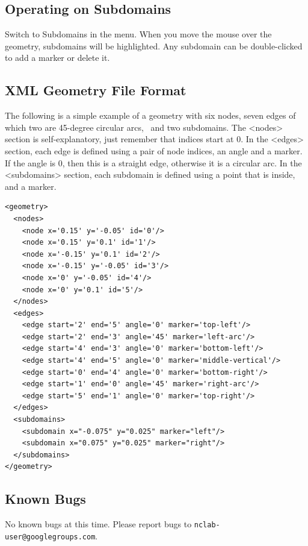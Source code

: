 \documentclass{article}
\begin{document}
\subsection*{Operating on Subdomains}

Switch to Subdomains in the menu. When you move the mouse over the geometry, subdomains will be highlighted. Any subdomain can be double-clicked to add a marker or delete it.

\subsection*{XML Geometry File Format}

The following is a simple example of a geometry with six nodes, seven edges of which two are 45-degree circular arcs,  and two subdomains. The <nodes> section is self-explanatory, just remember that indices start at 0. In the <edges> section, each edge is defined using a pair of node indices, an angle and a marker. If the angle is 0, then this is a straight edge, otherwise it is a circular arc. In the <subdomains> section, each subdomain is defined using a point that is inside, and a marker. 

\begin{verbatim}
<geometry>
  <nodes>
    <node x='0.15' y='-0.05' id='0'/>
    <node x='0.15' y='0.1' id='1'/>
    <node x='-0.15' y='0.1' id='2'/>
    <node x='-0.15' y='-0.05' id='3'/>
    <node x='0' y='-0.05' id='4'/>
    <node x='0' y='0.1' id='5'/>
  </nodes>
  <edges>
    <edge start='2' end='5' angle='0' marker='top-left'/>
    <edge start='2' end='3' angle='45' marker='left-arc'/>
    <edge start='4' end='3' angle='0' marker='bottom-left'/>
    <edge start='4' end='5' angle='0' marker='middle-vertical'/>
    <edge start='0' end='4' angle='0' marker='bottom-right'/>
    <edge start='1' end='0' angle='45' marker='right-arc'/>
    <edge start='5' end='1' angle='0' marker='top-right'/>
  </edges>
  <subdomains>
    <subdomain x="-0.075" y="0.025" marker="left"/>
    <subdomain x="0.075" y="0.025" marker="right"/>
  </subdomains>
</geometry>
\end{verbatim}

\subsection*{Known Bugs}

No known bugs at this time. Please report bugs to {\tt nclab-user@googlegroups.com}.
\end{document}
